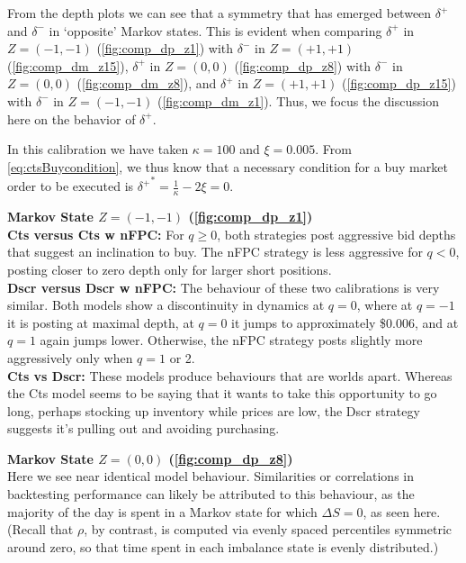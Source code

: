 From the depth plots we can see that a symmetry that has emerged between $\delta^+$ and $\delta^-$ in `opposite' Markov states. This is evident when comparing $\delta^+$ in $Z=(-1,-1)$ (\autoref{fig:comp_dp_z1}) with $\delta^-$ in $Z=(+1,+1)$ (\autoref{fig:comp_dm_z15}), $\delta^+$ in $Z=(0,0)$ (\autoref{fig:comp_dp_z8}) with $\delta^-$ in $Z=(0,0)$ (\autoref{fig:comp_dm_z8}), and $\delta^+$ in $Z=(+1,+1)$ (\autoref{fig:comp_dp_z15}) with $\delta^-$ in $Z=(-1,-1)$ (\autoref{fig:comp_dm_z1}). Thus, we focus the discussion here on the behavior of $\delta^+$.

In this calibration we have taken $\kappa=100$ and $\xi = 0.005$. From \eqref{eq:ctsBuycondition}, we thus know that a necessary condition for a buy market order to be executed is ${\delta^+}^* =  \frac{1}{\kappa} - 2 \xi = 0$.

{\bf Markov State $Z=(-1,-1)$ (\autoref{fig:comp_dp_z1})} \\
{\bf Cts versus Cts w nFPC:} For $q \geq 0$, both strategies post aggressive bid depths that suggest an inclination to buy. The nFPC strategy is less aggressive for $q<0$, posting closer to zero depth only for larger short positions.  \\
{\bf Dscr versus Dscr w nFPC:} The behaviour of these two calibrations is very similar. Both models show a discontinuity in dynamics at $q=0$, where at $q=-1$ it is posting at maximal depth, at $q=0$ it jumps to approximately \$0.006, and at $q=1$ again jumps lower. Otherwise, the nFPC strategy posts slightly more aggressively only when $q=1$ or 2. \\
{\bf Cts vs Dscr:} These models produce behaviours that are worlds apart. Whereas the Cts model seems to be saying that it wants to take this opportunity to go long, perhaps stocking up inventory while prices are low, the Dscr strategy suggests it's pulling out and avoiding purchasing. 

{\bf Markov State $Z=(0,0)$ (\autoref{fig:comp_dp_z8})}\\
Here we see near identical model behaviour. Similarities or correlations in backtesting performance can likely be attributed to this behaviour, as the majority of the day is spent in a Markov state for which $\Delta S = 0$, as seen here. (Recall that $\rho$, by contrast, is computed via evenly spaced percentiles symmetric around zero, so that time spent in each imbalance state is evenly distributed.)

